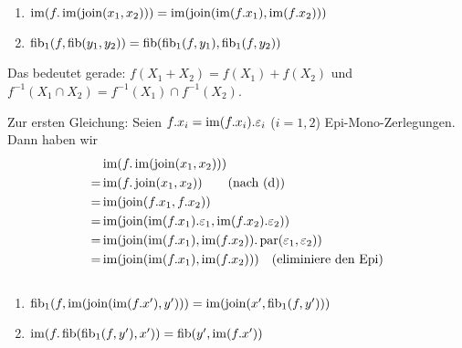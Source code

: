 \begin{lemm}[Regel (f)] $\quad$ %
\begin{enumerate}
\item $\im(f.\im(\join(x_1,x_2))) = \im(\join(\im(f.x_1),\im(f.x_2)))$
\item $\fib_1(f,\fib(y_1,y_2)) = \fib(\fib_1(f,y_1),\fib_1(f,y_2))$
\end{enumerate}
Das bedeutet gerade: $f(X_1 + X_2) = f(X_1) + f(X_2)$ und $f^{-1}(X_1\cap X_2) = f^{-1}(X_1) \cap f^{-1}(X_2)$.
\end{lemm}
\begin{bew}
Zur ersten Gleichung: Seien $f.x_i = \im(f.x_i).\varepsilon_i$ ($i=1,2$) Epi-Mono-Zerlegungen.
Dann haben wir
\begin{align*}
   & \im(f.\im(\join(x_1,x_2)))
\\=& \im(f.\join(x_1,x_2)) \qquad \text{(nach (d))}
\\=& \im(\join(f.x_1,f.x_2))
\\=& \im(\join(\im(f.x_1).\varepsilon_1,\im(f.x_2).\varepsilon_2))
\\=& \im(\join(\im(f.x_1),\im(f.x_2)).\para(\varepsilon_1,\varepsilon_2))
\\=& \im(\join(\im(f.x_1),\im(f.x_2))) \quad \text{(eliminiere den Epi)}
\end{align*}
\end{bew}

\begin{lemm} $\quad$ %
\begin{enumerate}
\item $\fib_1(f,\im(\join(\im(f.x'),y'))) = \im(\join(x',\fib_1(f,y')))$
\item $\im(f.\fib(\fib_1(f,y'),x')) = \fib(y',\im(f.x'))$
\end{enumerate}
\end{lemm}
